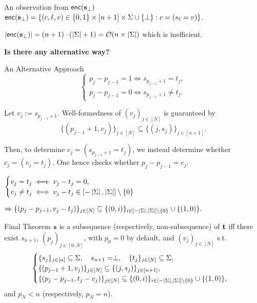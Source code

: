 \begin{frame}{An observation from $\mathsf{enc}(\mathbf{s}_\perp)$}
	$\mathsf{enc}(\mathbf{s}_\perp)  = \{(c, \ell, v) \in \{0,1\}\times[n+1]\times\Sigma\cup\{\perp\} : c = (s_\ell = v)\}$.
	
	$\left|\mathsf{enc}(\mathbf{s}_\perp)\right| = (n + 1)\cdot (\left|\Sigma\right| + 1) = \mathcal{O}(n \times \left|\Sigma\right|)$ which is inefficient.
	
	\begin{center}
		\textbf{Is there any alternative way?}
	\end{center}
\end{frame}

\begin{frame}{An Alternative Approach}
	\begin{equation*}
		\begin{cases}
			p_j - p_{j - 1} = 1 \iff s_{p_{j - 1} + 1} = t_j,\\ 
			p_j - p_{j - 1} = 0 \iff s_{p_{j - 1} + 1} \not= t_j.
		\end{cases}
	\end{equation*}
	
	Let $v_j := s_{p_{j - 1} + 1}$. Well-formedness of $(v_j)_{j \in [N]}$ is guaranteed by
	\begin{equation*}
		\{(p_{j - 1} + 1, v_j)\}_{j \in [N]} \subseteq \{(j, s_j)\}_{j \in [n + 1]}.
	\end{equation*}
	
	Then, to determine $ c_j = (s_{p_{j - 1} + 1} = t_j)$, we instead determine whether $c_j = (v_j = t_j)$. One hence checks whether $p_j - p_{j - 1} = c_j$.
	
	$
		\begin{cases}
			v_j = t_j \iff v_j - t_j = 0,\\ v_j\not=t_j\iff v_j - t_j \in [-\left|\Sigma\right|, \left|\Sigma\right|]\setminus\{0\}
		\end{cases}
	$ 
	
	$
		\Rightarrow \{(p_j - p_{j - 1}, v_j - t_j)\}_{j \in [N]} \subseteq \{(0, i)\}_{i \in [-\left|\Sigma\right|, \left|\Sigma\right|]\setminus\{0\}} \cup \{(1, 0)\}.
	$
\end{frame}

\begin{frame}{Final Theorem}
	$\mathbf{s}$ is a subsequence (respectively, non-subsequence) of $\mathbf{t}$  iff there exist $s_{n+1}$, $(p_j)_{j \in [0, N]}$, with $p_0=0$ by default,  and $(v_j)_{j \in [N]}$ s.t.
	\begin{equation*}%
		\begin{cases}
			\{s_j\}_{j \in [n]} \subseteq \Sigma,\quad s_{n+1} = \perp,\quad \{t_j\}_{j \in [N]} \subseteq \Sigma,\\
			\{(p_{j - 1} + 1, v_j)\}_{j \in [N]} \subseteq \{(j, s_j)\}_{j \in [n+1]},\\
			\{(p_j - p_{j - 1}, t_j - v_j)\}_{j \in [N]} \subseteq \{(0,i)\}_{i \in [-\size{\Sigma}, \size{\Sigma}]\setminus\{0\}} \cup \{(1, 0)\},
		\end{cases}
	\end{equation*}
	and $p_N < n$ (respectively, $p_N = n$).
\end{frame}